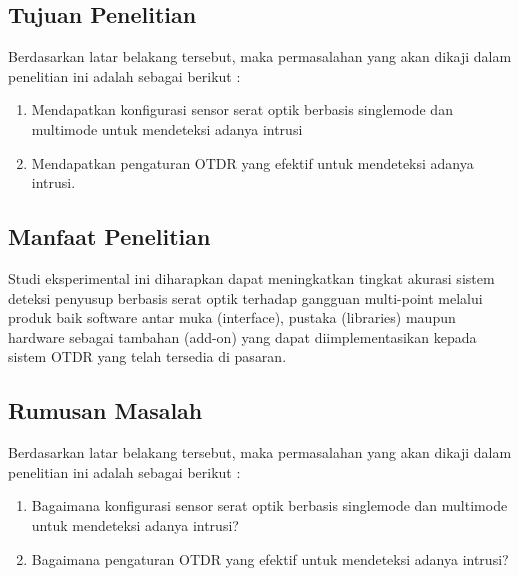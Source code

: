 \documentclass[12pt]{article}
\begin{document}
	\subsection{Tujuan Penelitian}

	Berdasarkan latar belakang tersebut, maka permasalahan yang akan dikaji dalam penelitian ini adalah sebagai berikut :
	
	\begin{enumerate}
			\item Mendapatkan konfigurasi sensor serat optik berbasis  singlemode dan multimode untuk mendeteksi adanya intrusi
			\item Mendapatkan pengaturan OTDR yang efektif untuk mendeteksi adanya intrusi. 
		\end{enumerate}


	\subsection{Manfaat Penelitian}
	
	Studi eksperimental ini diharapkan dapat meningkatkan tingkat akurasi sistem deteksi penyusup berbasis serat optik terhadap gangguan multi-point melalui produk baik software antar muka (interface), pustaka (libraries) maupun hardware sebagai tambahan (add-on) yang dapat diimplementasikan kepada sistem OTDR yang telah tersedia di pasaran.

	\subsection{Rumusan Masalah}
	
	Berdasarkan latar belakang tersebut, maka permasalahan yang akan dikaji dalam penelitian ini adalah sebagai berikut :
	
	\begin{enumerate}
		\item Bagaimana konfigurasi sensor serat optik berbasis singlemode dan multimode untuk mendeteksi adanya intrusi?
		\item Bagaimana pengaturan OTDR yang efektif untuk mendeteksi adanya intrusi?
	\end{enumerate}


	

\newpage
\thispagestyle{plain}
\mbox{}

\end{document}
